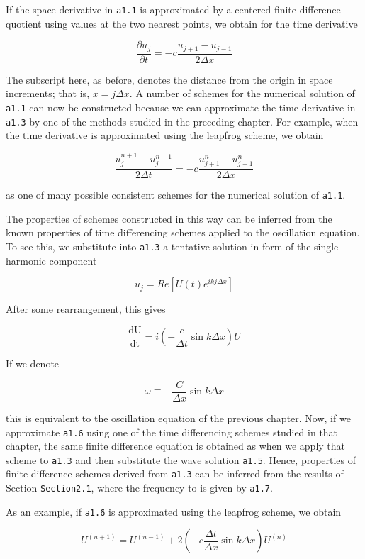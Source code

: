 If the space derivative in \texttt{a1.1} is approximated by a centered
finite difference quotient using values at the two nearest points, we
obtain for the time derivative

{\[\frac{\partial u_{j}}{\partial t} = - c\frac{u_{j + 1} - u_{j - 1}}{2\Delta x}\]}

The subscript here, as before, denotes the distance from the origin in
space increments; that is, \(x = j\Delta x\). A number of schemes for
the numerical solution of \texttt{a1.1} can now be constructed because
we can approximate the time derivative in \texttt{a1.3} by one of the
methods studied in the preceding chapter. For example, when the time
derivative is approximated using the leapfrog scheme, we obtain

{\[\frac{u_{j}^{n + 1} - u_{j}^{n - 1}}{2\Delta t} = - c\frac{u_{j + 1}^n - u_{j - 1}^n}{2\Delta x}\]}

as one of many possible consistent schemes for the numerical solution of
\texttt{a1.1}.

The properties of schemes constructed in this way can be inferred from
the known properties of time differencing schemes applied to the
oscillation equation. To see this, we substitute into \texttt{a1.3} a
tentative solution in form of the single harmonic component

{\[u_{j} = Re\left\lbrack U\left( t \right)e^{ikj\Delta x} \right\rbrack\]}

After some rearrangement, this gives

{\[\frac{\text{dU}}{\text{dt}} = i\left( - \frac{c}{\Delta t}\sin{k\Delta x} \right)U\]}

If we denote

{\[\omega \equiv - \frac{C}{\Delta x}\sin{k\Delta x}\]}

this is equivalent to the oscillation equation of the previous chapter.
Now, if we approximate \texttt{a1.6} using one of the time differencing
schemes studied in that chapter, the same finite difference equation is
obtained as when we apply that scheme to \texttt{a1.3} and then
substitute the wave solution \texttt{a1.5}. Hence, properties of finite
difference schemes derived from \texttt{a1.3} can be inferred from the
results of Section \texttt{Section2.1}, where the frequency to is given
by \texttt{a1.7}.

As an example, if \texttt{a1.6} is approximated using the leapfrog
scheme, we obtain

{\[U^{\left( n + 1 \right)} = U^{\left( n - 1 \right)} + 2\left( - c\frac{\Delta t}{\Delta x}\sin{k\Delta x} \right)U^{\left( n \right)}\]}

